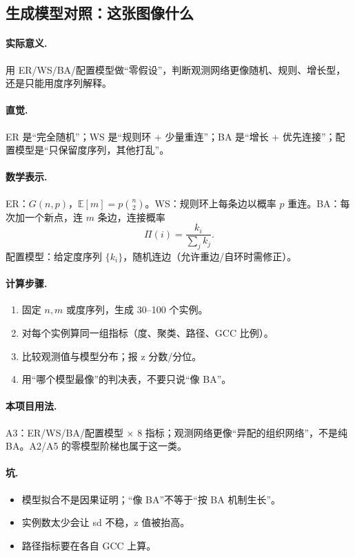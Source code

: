 \subsection{生成模型对照：这张图像什么}

\paragraph{实际意义.}
用 ER/WS/BA/配置模型做“零假设”，判断观测网络更像随机、规则、增长型，还是只能用度序列解释。

\paragraph{直觉.}
ER 是“完全随机”；WS 是“规则环 + 少量重连”；BA 是“增长 + 优先连接”；配置模型是“只保留度序列，其他打乱”。

\paragraph{数学表示.}
ER：\(G(n,p)\)，\(\mathbb{E}[m]=p\binom{n}{2}\)。WS：规则环上每条边以概率 \(p\) 重连。BA：每次加一个新点，连 \(m\) 条边，连接概率
\[
\Pi(i)=\frac{k_i}{\sum_j k_j}.
\]
配置模型：给定度序列 \(\{k_i\}\)，随机连边（允许重边/自环时需修正）。

\paragraph{计算步骤.}
\begin{enumerate}
  \item 固定 \(n,m\) 或度序列，生成 30--100 个实例。
  \item 对每个实例算同一组指标（度、聚类、路径、GCC 比例）。
  \item 比较观测值与模型分布；报 z 分数/分位。
  \item 用“哪个模型最像”的判决表，不要只说“像 BA”。
\end{enumerate}

\paragraph{本项目用法.}
\unit{A3}：ER/WS/BA/配置模型 × 8 指标；观测网络更像“异配的组织网络”，不是纯 BA。A2/A5 的零模型阶梯也属于这一类。

\paragraph{坑.}
\begin{itemize}
  \item 模型拟合不是因果证明；“像 BA”不等于“按 BA 机制生长”。
  \item 实例数太少会让 sd 不稳，z 值被抬高。
  \item 路径指标要在各自 GCC 上算。
\end{itemize}

